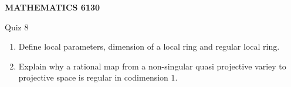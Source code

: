 \documentclass[12pt]{amsart}
\begin{document}
\bigskip\bigskip\bigskip\bigskip
\centerline{\bf MATHEMATICS 6130}
\centerline{Quiz 8}
\begin{enumerate}\item Define local parameters, dimension of a local ring and regular local ring.
\item Explain why a rational map from a non-singular quasi projective variey to 
projective space is regular in codimension $1$.
\end{enumerate}
\end{document}
